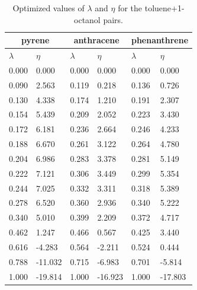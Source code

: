 \begin{table}[h]
	\centering
	\caption{Optimized values of $\lambda $ and $\eta$ for the toluene+1-octanol pairs.}
	\begin{tabular}{llllll}
		\hline
		\multicolumn{2}{c}{pyrene}& \multicolumn{2}{c}{anthracene}& \multicolumn{2}{c}{phenanthrene}\\
		\hline\hline
		$\lambda$ & $\eta$ & $\lambda$ & $\eta$  & $\lambda$ & $\eta$   \\ 
		\hline\hline
		0.000	&	0.000	&	0.000	&	0.000	&	0.000	&	0.000	\\
		0.090	&	2.563	&	0.119	&	0.218	&	0.136	&	0.726	\\
		0.130	&	4.338	&	0.174	&	1.210	&	0.191	&	2.307	\\
		0.154	&	5.439	&	0.209	&	2.052	&	0.223	&	3.430	\\
		0.172	&	6.181	&	0.236	&	2.664	&	0.246	&	4.233	\\
		0.188	&	6.670	&	0.261	&	3.122	&	0.264	&	4.780	\\
		0.204	&	6.986	&	0.283	&	3.378	&	0.281	&	5.149	\\
		0.222	&	7.121	&	0.306	&	3.449	&	0.299	&	5.354	\\
		0.244	&	7.025	&	0.332	&	3.311	&	0.318	&	5.389	\\
		0.278	&	6.520	&	0.360	&	2.936	&	0.340	&	5.222	\\
		0.340	&	5.010	&	0.399	&	2.209	&	0.372	&	4.717	\\
		0.462	&	1.247	&	0.466	&	0.567	&	0.425	&	3.440	\\
		0.616	&	-4.283	&	0.564	&	-2.211	&	0.524	&	0.444	\\
		0.788	&	-11.032	&	0.715	&	-6.983	&	0.701	&	-5.814	\\
		1.000	&	-19.814	&	1.000	&	-16.923	&	1.000	&	-17.803	\\		
		\hline\hline
	\end{tabular}
\end{table}
